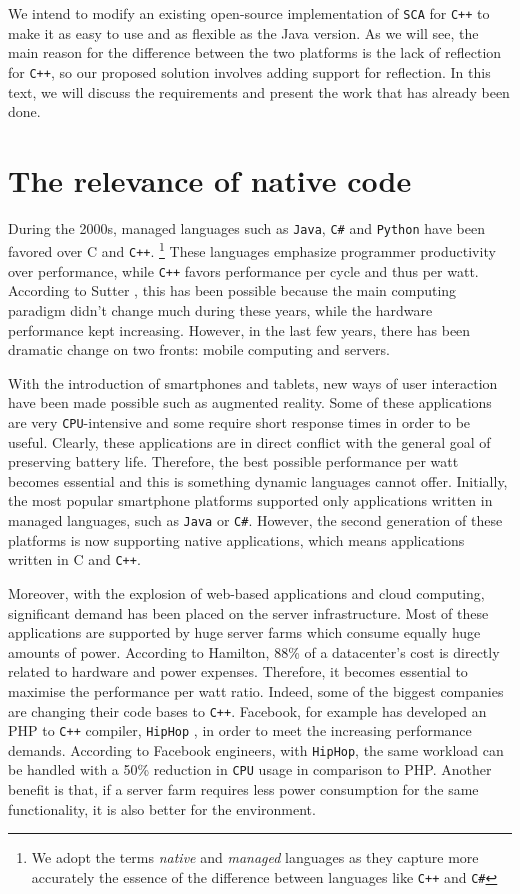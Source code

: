 We intend to modify an existing open-source implementation of \texttt{SCA} for \texttt{C++} to make it as easy to use and as
flexible as the Java version. As we will see, the main reason for the difference between the two platforms is the lack of
reflection for \texttt{C++}, so our proposed solution involves adding support for reflection. In this text, we will discuss
the requirements and present the work that has already been done.


\section{The relevance of native code}\label{sec:cpp}

During the 2000s, managed languages such as \texttt{Java}, \texttt{C\#} and \texttt{Python} have been favored over C and \texttt{C++}.
\footnote{We adopt the terms \emph{native} and \emph{managed} languages as they capture more accurately the essence
of the difference between languages like \texttt{C++} and \texttt{C\#}}
These languages emphasize programmer productivity over performance, while \texttt{C++} favors performance per cycle and thus per watt. 
According to Sutter \cite{CPPAndBeyond2011}, this has been possible because the main computing paradigm didn't change much during these years,
while the hardware performance kept increasing. However, in the last few years, there has been dramatic change on two fronts:
mobile computing and servers.

With the introduction of smartphones and tablets, new ways of user interaction have been made possible such as augmented reality. Some of
these applications are very \texttt{CPU}-intensive and some require short response times in order to be useful. Clearly, these applications are in
direct conflict with the general goal of preserving battery life. Therefore, the best possible performance per watt becomes essential
and this is something dynamic languages cannot offer. Initially, the most popular smartphone platforms supported only applications
written in managed languages, such as \texttt{Java} or \texttt{C\#}. However, the second generation of these platforms is now supporting native applications,
which means applications written in C and \texttt{C++}.

Moreover, with the explosion of web-based applications and cloud computing, significant demand has been placed on the server infrastructure.
Most of these applications are supported by huge server farms which consume equally huge amounts of power. According to Hamilton, \cite{Hamilton}
88\% of a datacenter's cost is directly related to hardware and power expenses. Therefore, it becomes essential to maximise the performance per watt ratio. Indeed, some of the biggest companies are changing their code bases to \texttt{C++}. Facebook,
for example has developed an PHP to \texttt{C++} compiler, \texttt{HipHop} \cite{HipHop}, in order to meet the increasing performance demands. According to Facebook engineers,
with \texttt{HipHop}, the same workload can be handled with a 50\% reduction in \texttt{CPU} usage in comparison to PHP. Another benefit is that, if a server farm requires
less power consumption for the same functionality, it is also better for the environment.

